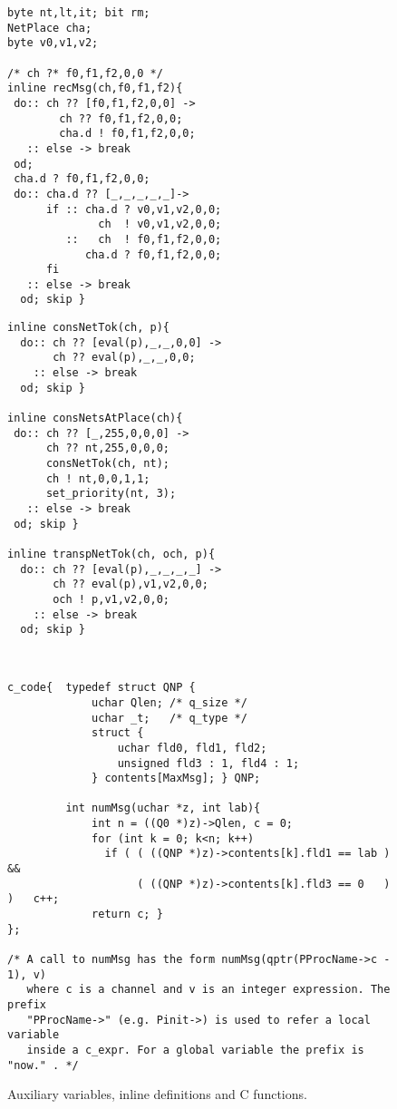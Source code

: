 \documentclass{llncs}
\begin{document}
\mfont
\begin{figure}[h!]
\begin{multicols}{2}
\begin{minipage}[t]{0.5\textwidth}\begin{verbatim}
byte nt,lt,it; bit rm;
NetPlace cha;
byte v0,v1,v2;

/* ch ?* f0,f1,f2,0,0 */
inline recMsg(ch,f0,f1,f2){
 do:: ch ?? [f0,f1,f2,0,0] ->
        ch ?? f0,f1,f2,0,0;
        cha.d ! f0,f1,f2,0,0;
   :: else -> break
 od;
 cha.d ? f0,f1,f2,0,0;
 do:: cha.d ?? [_,_,_,_,_]->
      if :: cha.d ? v0,v1,v2,0,0;
              ch  ! v0,v1,v2,0,0;
         ::   ch  ! f0,f1,f2,0,0;
            cha.d ? f0,f1,f2,0,0;
      fi
   :: else -> break
  od; skip }
\end{verbatim}
\end{minipage}

\begin{minipage}[t]{0.5\textwidth}\begin{verbatim}
inline consNetTok(ch, p){
  do:: ch ?? [eval(p),_,_,0,0] ->
       ch ?? eval(p),_,_,0,0;
    :: else -> break
  od; skip }

inline consNetsAtPlace(ch){
 do:: ch ?? [_,255,0,0,0] ->
      ch ?? nt,255,0,0,0;
      consNetTok(ch, nt);
      ch ! nt,0,0,1,1;
      set_priority(nt, 3);
   :: else -> break
 od; skip }

inline transpNetTok(ch, och, p){
  do:: ch ?? [eval(p),_,_,_,_] ->
       ch ?? eval(p),v1,v2,0,0;
       och ! p,v1,v2,0,0;
    :: else -> break
  od; skip }
\end{verbatim}
\end{minipage}
\end{multicols}

\begin{verbatim}


c_code{  typedef struct QNP {
             uchar Qlen; /* q_size */
             uchar _t;   /* q_type */
             struct {
                 uchar fld0, fld1, fld2;
                 unsigned fld3 : 1, fld4 : 1;
             } contents[MaxMsg]; } QNP;

         int numMsg(uchar *z, int lab){
             int n = ((Q0 *)z)->Qlen, c = 0;
             for (int k = 0; k<n; k++)
               if ( ( ((QNP *)z)->contents[k].fld1 == lab )  &&
                    ( ((QNP *)z)->contents[k].fld3 == 0   ) )   c++;
             return c; }
};

/* A call to numMsg has the form numMsg(qptr(PProcName->c - 1), v)
   where c is a channel and v is an integer expression. The prefix
   "PProcName->" (e.g. Pinit->) is used to refer a local variable
   inside a c_expr. For a global variable the prefix is "now." . */
\end{verbatim}

\vspace{-10pt}
\caption{Auxiliary variables, inline definitions and  C functions.}
\label{app1}
\end{figure}
\nfont
\end{document}
